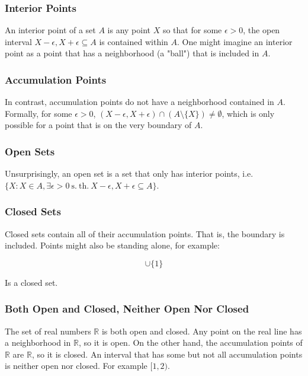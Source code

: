 \subsubsection{Interior Points}
An interior point of a set $A$ is any point $X$ so that for some $\epsilon > 0$, the open interval $X-\epsilon,X+\epsilon \subseteq A$ is contained within $A$. One might imagine an interior point as a point that has a neighborhood (a "ball") that is included in $A$. 

\subsubsection{Accumulation Points} 
In contrast, accumulation points do not have a neighborhood contained in $A$. Formally, for some $\epsilon>0$, $(X-\epsilon,X+\epsilon)\cap (A\setminus \{X\}) \neq \emptyset$, which is only possible for a point that is on the very boundary of $A$.

\subsubsection{Open Sets}
Unsurprisingly, an open set is a set that only has interior points, i.e. $\{X: X\in A, \exists \epsilon > 0 \mathrm{\ s.\ th.\ } X-\epsilon,X+\epsilon \subseteq A  \}$.

\subsubsection{Closed Sets}
Closed sets contain all of their accumulation points. That is, the boundary is included. Points might also be standing alone, for example:

\begin{equation}
[2,4]\cup\{1\}
\end{equation}

Is a closed set.

\subsubsection{Both Open and Closed, Neither Open Nor Closed}
The set of real numbers $\mathbb{R}$ is both open and closed. Any point on the real line has a neighborhood in $\mathbb{R}$, so it is open. On the other hand, the accumulation points of $\mathbb{R}$ are $\mathbb{R}$, so it is closed. An interval that has some but not all accumulation points is neither open nor closed. For example $[1,2)$.	




